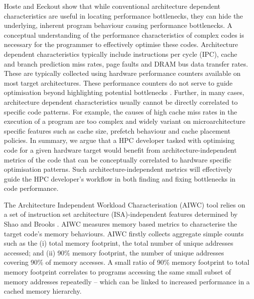 \documentclass[review=false, sigchi]{acmart}
\begin{document}
	Hoste and Eeckout \cite{hoste2007microarchitecture} show that while conventional architecture dependent characteristics are useful in locating performance bottlenecks, they can hide the underlying, inherent program behaviour causing performance bottlenecks. A conceptual understanding of the performance characteristics of complex codes is necessary for the programmer to effectively optimise these codes. Architecture dependent characteristics typically include instructions per cycle (IPC), cache and branch prediction miss rates, page faults and DRAM bus data transfer rates. These are typically collected using hardware performance counters available on most target architectures. These performance counters do not serve to guide optimisation beyond highlighting potential bottlenecks \cite{hoste2007microarchitecture, ganesan2008performance}. Further, in many cases, architecture dependent characteristics usually cannot be directly correlated to specific code patterns. For example, the causes of high cache miss rates in the execution of a program are too complex and widely variant on microarchitecture specific features such as cache size, prefetch behaviour and cache placement policies. In summary, we argue that a HPC developer tasked with optimising code for a given hardware target would benefit from architecture-independent metrics of the code that can be conceptually correlated to hardware specific optimisation patterns. Such architecture-independent metrics will effectively guide the HPC developer's workflow in both finding and fixing bottlenecks in code performance.
	
	The Architecture Independent Workload Characterisation (AIWC) tool \cite{beauaiwc} relies on a set of instruction set architecture (ISA)-independent features determined by Shao and Brooks \cite{shao2013isa}. AIWC measures memory based metrics to characterise the target code's memory behaviours. AIWC firstly collects aggregate simple counts such as the (i) total memory footprint, the total number of unique addresses accessed; and (ii) 90\% memory footprint, the number of unique addresses covering 90\% of memory accesses. A small ratio of 90\% memory footprint to total memory footprint correlates to programs accessing the same small subset of memory addresses repeatedly -- which can be linked to increased performance in a cached memory hierarchy.
	
\end{document}
